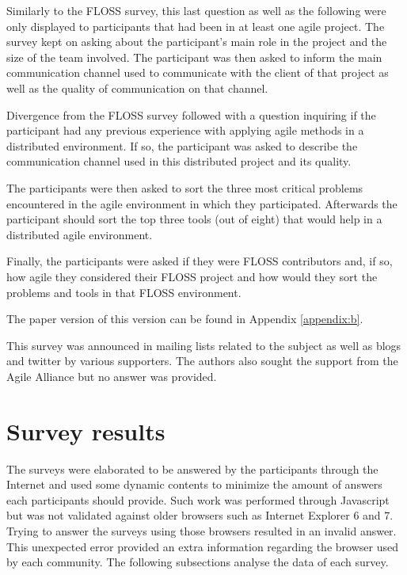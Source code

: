 \documentclass[lnbip]{svmultln}
\newcommand{\footnoterecall}[1]{
  \footnotemark[\value{#1}]
}
\begin{document}
Similarly to the FLOSS survey, this last question as well as the
following were only displayed to participants that had been in at
least one agile project. The survey kept on asking about the
participant's main role in the project and the size of the team
involved. The participant was then asked to inform the main
communication channel used to communicate with the client of that
project as well as the quality of communication on that channel.

Divergence from the FLOSS survey followed with a question inquiring if
the participant had any previous experience with applying agile
methods in a distributed environment. If so, the participant was asked
to describe the communication channel used in this distributed project
and its quality.

The participants were then asked to sort the three most critical
problems encountered in the agile environment in which they
participated. Afterwards the participant should sort the top three
tools (out of eight) that would help in a distributed agile
environment.

Finally, the participants were asked if they were FLOSS contributors
and, if so, how agile they considered their FLOSS project and how
would they sort the problems and tools in that FLOSS environment.

The paper version of this version can be found in Appendix
\ref{appendix:b}.\footnoterecall{onlineoff}

This survey was announced in mailing lists related to the subject as
well as blogs and twitter by various supporters. The authors also
sought the support from the Agile Alliance but no answer was provided.

\section{Survey results}
\label{sec:results}

The surveys were elaborated to be answered by the participants through
the Internet and used some dynamic contents to minimize the amount of
answers each participants should provide. Such work was performed
through Javascript but was not validated against older browsers such
as Internet Explorer 6 and 7. Trying to answer the surveys using those
browsers resulted in an invalid answer. This unexpected error provided
an extra information regarding the browser used by each community. The
following subsections analyse the data of each survey.
\end{document}
